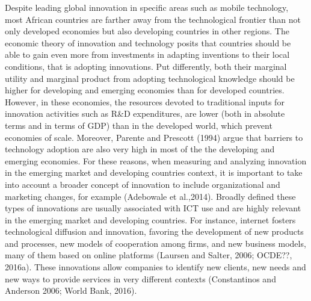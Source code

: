 \documentclass[11pt]{article}
\begin{document}
{Despite leading global innovation in specific areas such as mobile technology, most African countries are farther away from the technological frontier than not only developed economies but also developing countries in other regions. The economic theory of innovation and technology posits that countries should be able to gain even more from investments in adapting inventions to their local conditions, that is adopting innovations. Put differently, both their marginal utility and marginal product from adopting technological knowledge should be higher for developing and emerging economies than for developed countries. However, in these economies, the resources devoted to traditional inputs for innovation activities such as R\&D expenditures, are lower (both in absolute terms and in terms of GDP) than in the developed world, which prevent economies of scale. Moreover, Parente and Prescott (1994) argue that barriers to technology adoption are also very high in most of the the developing and emerging economies.
For these reasons, when measuring and analyzing innovation in the emerging market and developing countries context, it is important to take into account a broader concept of innovation to include organizational and marketing changes, for example (Adebowale et al.,2014). Broadly defined these types of innovations are usually associated with ICT use and are highly relevant in the emerging market and developing countries. For instance, internet fosters technological diffusion and innovation, favoring the development of new products and processes, new models of cooperation among firms, and new business models, many of them based on online platforms (Laursen and Salter, 2006; OCDE??, 2016a). These innovations allow companies to identify new clients, new needs and new ways to provide services in very different contexts (Constantinos and Anderson 2006; World Bank, 2016).  

}
\end{document}
